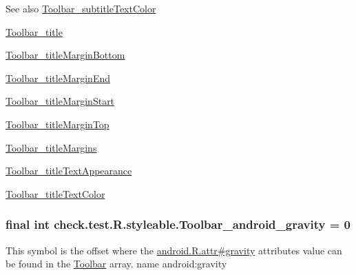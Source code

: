 \begin{DoxySeeAlso}{See also}
\hyperlink{classcheck_1_1test_1_1_r_1_1styleable_ac4cc2a3f74200eb561317a2f73280838}{Toolbar\+\_\+subtitle\+Text\+Color} 

\hyperlink{classcheck_1_1test_1_1_r_1_1styleable_a10fa1bd14d7aa843ac28da6df2e66b54}{Toolbar\+\_\+title} 

\hyperlink{classcheck_1_1test_1_1_r_1_1styleable_a5e6ae0606eec219fca6a04beab67b4b3}{Toolbar\+\_\+title\+Margin\+Bottom} 

\hyperlink{classcheck_1_1test_1_1_r_1_1styleable_a17f1cea527896f8c82a64142d730f2bc}{Toolbar\+\_\+title\+Margin\+End} 

\hyperlink{classcheck_1_1test_1_1_r_1_1styleable_a4a55fbefdcf687934e2c57f3a12cfb1d}{Toolbar\+\_\+title\+Margin\+Start} 

\hyperlink{classcheck_1_1test_1_1_r_1_1styleable_a90b959cc7186d99612ffd6e5a1ded83b}{Toolbar\+\_\+title\+Margin\+Top} 

\hyperlink{classcheck_1_1test_1_1_r_1_1styleable_a198e72fff825b1e6049c5dbbb9265945}{Toolbar\+\_\+title\+Margins} 

\hyperlink{classcheck_1_1test_1_1_r_1_1styleable_a57757c8f75dedaa99dff594776088620}{Toolbar\+\_\+title\+Text\+Appearance} 

\hyperlink{classcheck_1_1test_1_1_r_1_1styleable_ad2cf34c85cd9f2275558a3082471052a}{Toolbar\+\_\+title\+Text\+Color} 
\end{DoxySeeAlso}
\hypertarget{classcheck_1_1test_1_1_r_1_1styleable_a573eae0b826181d39d3b0ac3c26b7ec7}{}
\subsubsection[{Toolbar\+\_\+android\+\_\+gravity}]{\setlength{\rightskip}{0pt plus 5cm}final int check.\+test.\+R.\+styleable.\+Toolbar\+\_\+android\+\_\+gravity = 0\hspace{0.3cm}{\ttfamily [static]}}\label{classcheck_1_1test_1_1_r_1_1styleable_a573eae0b826181d39d3b0ac3c26b7ec7}
This symbol is the offset where the \hyperlink{}{android.\+R.\+attr\#gravity} attribute\textquotesingle{}s value can be found in the \hyperlink{classcheck_1_1test_1_1_r_1_1styleable_a1a7fa90223693abef77e7484cca2df54}{Toolbar} array.  name android\+:gravity \hypertarget{classcheck_1_1test_1_1_r_1_1styleable_a50d77cb71359f8a286d3bcd9212afde6}{}
